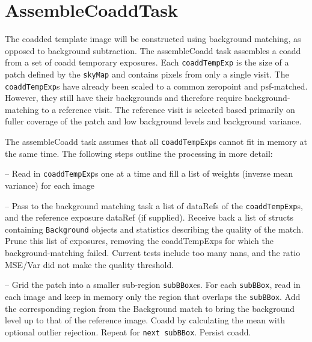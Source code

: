 \documentclass[12pt]{article}
\begin{document}
\clearpage 
\section{AssembleCoaddTask} 

The coadded template image will be constructed using background
matching, as opposed to background subtraction. The assembleCoadd task assembles a coadd from a set of coadd temporary exposures.   Each {\tt coaddTempExp} is the size of a patch defined by the {\tt skyMap} and contains pixels from only a single visit.  The {\tt coaddTempExp}s have already been scaled to a common zeropoint and psf-matched.  However, they still have their backgrounds and therefore require background-matching to a reference visit. The reference visit is selected based primarily on fuller coverage of the patch and low background levels and background variance. 

The assembleCoadd task assumes that all {\tt coaddTempExp}s cannot fit in memory at the same time. The following steps outline the processing in more detail:

-- Read in {\tt coaddTempExp}s one at a time and fill a list of weights (inverse mean variance) for each image 

-- Pass to the background matching task a list of dataRefs of the {\tt coaddTempExp}s, and the reference exposure dataRef (if supplied).  Receive back a list of structs containing {\tt Background} objects and statistics describing the quality of the match.  Prune this list of exposures, removing the coaddTempExps for which the background-matching failed.  Current tests include too many nans, and the ratio MSE/Var did not make the quality threshold.

-- Grid the patch into a smaller sub-region {\tt subBBox}es. For each {\tt subBBox}, read in each image and keep in memory only the region that overlaps the {\tt subBBox}. Add the corresponding region from the Background match to bring the background level up to that of the reference image.  Coadd by calculating the mean with optional outlier rejection.  Repeat for {\tt next subBBox}.  Persist coadd. 


\end{document}
